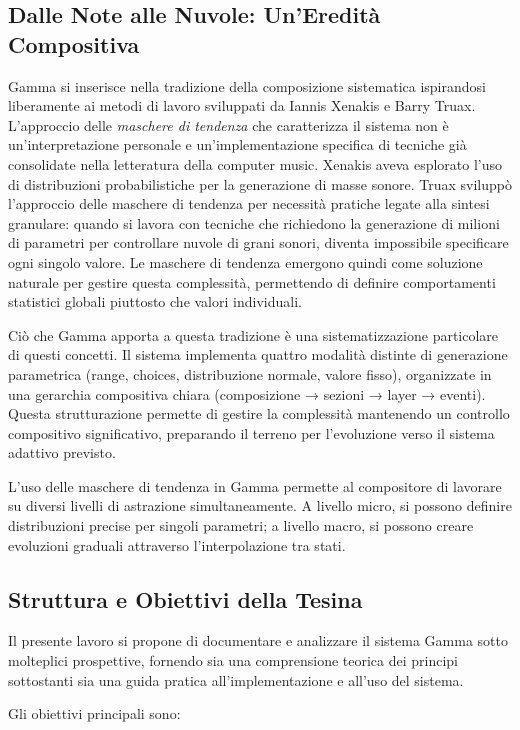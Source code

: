 \subsection{Dalle Note alle Nuvole: Un'Eredità Compositiva}
Gamma si inserisce nella tradizione della composizione sistematica ispirandosi liberamente ai metodi di lavoro sviluppati da Iannis Xenakis e Barry Truax. L'approccio delle \textit{maschere di tendenza} che caratterizza il sistema non è un'interpretazione personale e un'implementazione specifica di tecniche già consolidate nella letteratura della computer music. Xenakis aveva esplorato l'uso di distribuzioni probabilistiche per la generazione di masse sonore. Truax sviluppò l'approccio delle maschere di tendenza per necessità pratiche legate alla sintesi granulare: quando si lavora con tecniche che richiedono la generazione di milioni di parametri per controllare nuvole di grani sonori, diventa impossibile specificare ogni singolo valore. Le maschere di tendenza emergono quindi come soluzione naturale per gestire questa complessità, permettendo di definire comportamenti statistici globali piuttosto che valori individuali.

Ciò che Gamma apporta a questa tradizione è una sistematizzazione particolare di questi concetti. Il sistema implementa quattro modalità distinte di generazione parametrica (range, choices, distribuzione normale, valore fisso), organizzate in una gerarchia compositiva chiara (composizione → sezioni → layer → eventi). Questa strutturazione permette di gestire la complessità mantenendo un controllo compositivo significativo, preparando il terreno per l'evoluzione verso il sistema adattivo previsto.

L'uso delle maschere di tendenza in Gamma permette al compositore di lavorare su diversi livelli di astrazione simultaneamente. A livello micro, si possono definire distribuzioni precise per singoli parametri; a livello macro, si possono creare evoluzioni graduali attraverso l'interpolazione tra stati.
\subsection{Struttura e Obiettivi della Tesina}
Il presente lavoro si propone di documentare e analizzare il sistema Gamma sotto molteplici prospettive, fornendo sia una comprensione teorica dei principi sottostanti sia una guida pratica all'implementazione e all'uso del sistema.

Gli obiettivi principali sono:

